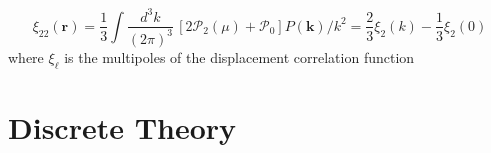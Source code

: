\documentclass[a4paper,11pt]{article}
\begin{document}
\begin{equation}
  \xi_{22}(\bm{r}) = \frac{1}{3} \int \frac{d^3 k}{(2\pi)^3} \,
             \left[ 2 \mathcal{P}_2(\mu) + \mathcal{P}_0 \right] P(\bm{k})/k^2
             = \frac{2}{3}  \xi_2(k) - \frac{1}{3} \xi_2(0)
\end{equation}
where $\xi_\ell$ is the multipoles of the displacement correlation function

\section{Discrete Theory}


\label{LastPage}
\end{document}
